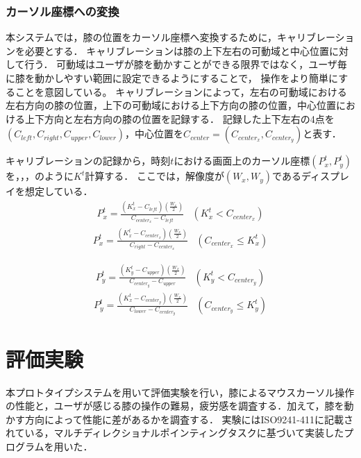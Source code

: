 \documentclass[submit, techrep]{ipsj}
\begin{document}
\subsubsection{カーソル座標への変換}
本システムでは，膝の位置をカーソル座標へ変換するために，キャリブレーションを必要とする．
キャリブレーションは膝の上下左右の可動域と中心位置に対して行う．
可動域はユーザが膝を動かすことができる限界ではなく，ユーザ毎に膝を動かしやすい範囲に設定できるようにすることで，
操作をより簡単にすることを意図している。
キャリブレーションによって，左右の可動域における左右方向の膝の位置，上下の可動域における上下方向の膝の位置，中心位置における上下方向と左右方向の膝の位置を記録する．
記録した上下左右の4点を$(C_{left},C_{right},C_{upper},C_{lower})$，中心位置を$C_{center}=(C_{center_x},  C_{center_y})$と表す．\par
キャリブレーションの記録から，時刻$t$における画面上のカーソル座標$(P^t_x, P^t_y)$を，，，のように$K^t$計算する．
ここでは，解像度が$(W_x, W_y)$であるディスプレイを想定している．
\begin{eqnarray}
	\label{eq:calc_px1}
	P^t_x = 
		\frac{(K^t_x - C_{left}) \left( \frac{W_x}{2} \right)}{C_{center_x} - C_{left}} & (K^t_x < C_{center_x})
\end{eqnarray}
\begin{eqnarray}
	\label{eq:calc_px2}
	P^t_x = 
		\frac{(K^t_x - C_{center_x}) \left( \frac{W_x}{2} \right)}{C_{right} - C_{center_x}} & (C_{center_x} \leq K^t_x) 
\end{eqnarray}

\begin{eqnarray}
	\label{eq:calc_py1}
	P^t_y = 
		\frac{(K^t_y - C_{upper}) \left( \frac{W_x}{2} \right)}{C_{center_y} - C_{upper}} & (K^t_y < C_{center_y}) 
\end{eqnarray}
\begin{eqnarray}
	\label{eq:calc_py2}
	P^t_y = 
		\frac{(K^t_x - C_{center_y}) \left( \frac{W_x}{2} \right)}{C_{lower} - C_{center_y}} & (C_{center_y} \leq K^t_y)
\end{eqnarray}
\section{評価実験}
本プロトタイプシステムを用いて評価実験を行い，膝によるマウスカーソル操作の性能と，ユーザが感じる膝の操作の難易，疲労感を調査する．加えて，膝を動かす方向によって性能に差があるかを調査する．
実験にはISO9241-411\cite{9241411}に記載されている，マルチディレクショナルポインティングタスクに基づいて実装したプログラムを用いた．
\end{document}
